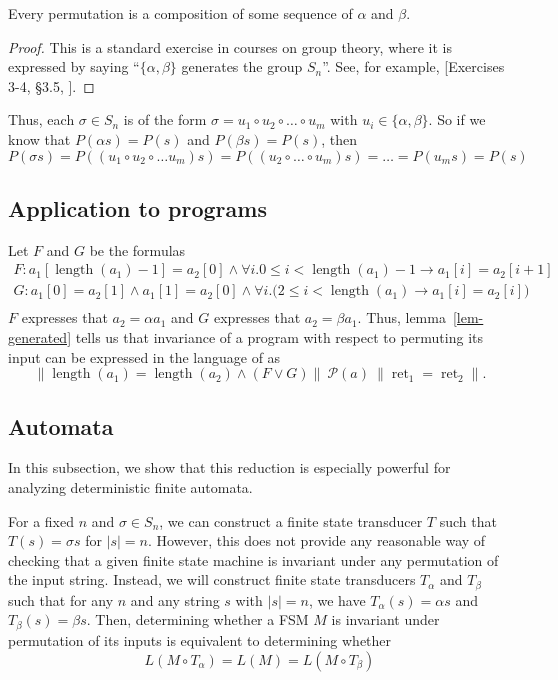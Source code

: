 \documentclass{llncs}
\DeclareMathOperator{\len}{length}
\DeclareMathOperator{\ret}{ret}
\begin{document}
  \begin{lemma} \label{lem-generated}
    Every permutation is a composition of some sequence of $\alpha$ and $\beta$.
  \end{lemma}
  \begin{proof}
    This is a standard exercise in courses on group theory,
    where it is expressed by saying ``$\{\alpha,\beta\}$ generates 
    the group $S_n$''.
    See, for example, [Exercises 3-4, \S3.5, \cite{dummitfoote}].
  \end{proof}

  Thus, each $\sigma \in S_n$ is of the form
  $\sigma = u_1 \circ u_2 \circ \ldots \circ u_m$ with
  $u_i \in \{\alpha,\beta\}$.
  So if we know that $P(\alpha s) = P(s)$ and $P(\beta s) = P(s)$,
  then 
  \[ P(\sigma s) 
    = P((u_1\circ u_2\circ \ldots u_m)s)
    = P((u_2 \circ \ldots \circ u_{m})s)
    = \ldots = P(u_ms) = P(s)
  \]


  \subsection{Application to programs}

    Let \(F\) and \(G\) be the formulas
    \begin{gather*}
        F:  a_{1}[\len(a_{1})-1] = a_{2}[0] 
          \wedge \forall i. 0 \leq i < \len(a_{1})-1 \rightarrow a_{1}[i] = a_{2}[i+1] \\
        G: a_{1}[0] = a_{2}[1] \wedge a_{1}[1] = a_{2}[0] \wedge 
          \forall i.\big( 2 \leq i < \len(a_{1}) \rightarrow a_{1}[i] = a_{2}[i] \big) \\
    \end{gather*}
    $F$ expresses that $a_2 = \alpha a_1$ and $G$ expresses that 
    $a_2 = \beta a_1$.
    Thus, lemma~\ref{lem-generated} tells us that
    invariance of a program with respect to permuting its input
    can be expressed in the language of \cite{sousa16} as
    \[
      \|\len(a_{1}) = \len(a_{2}) \wedge (F \vee G)\| \ 
        \mathcal{P}(a) \  \|\ret_{1} = \ret_{2}\|.
    \]

  \subsection{Automata}
    In this subsection, we show that this reduction is especially powerful for
    analyzing deterministic finite automata.

    For a fixed $n$ and $\sigma \in S_n$, we can construct a finite state
    transducer $T$ such that $T(s) = \sigma s$ for $|s|=n$.  However, this does
    not provide any reasonable way of checking that a given finite state machine
    is invariant under any permutation of the input string.  Instead, we will
    construct finite state transducers $T_{\alpha}$ and $T_{\beta}$ such that
    for any $n$ and any string $s$ with $|s|=n$, we have $T_{\alpha}(s)=\alpha s$
    and $T_{\beta}(s) =\beta s$. Then, determining whether a FSM $M$ is
    invariant under permutation of its inputs is equivalent to determining
    whether
    \[
      L(M \circ T_\alpha) = L(M) = L(M \circ T_\beta)
    \]
\end{document}
